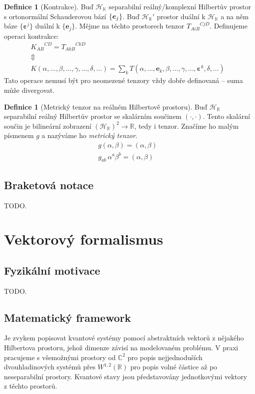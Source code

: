 \documentclass[10pt,a4paper]{report}
\theoremstyle{definition}
\newtheorem{definition}[theorem]{Definice}
\def\R{\mathbb{R}}
\def\C{\mathbb{C}}
\def\K{\mathbb{K}}
\def\H{\mathcal{H}}
\begin{document}
\begin{definition}[Kontrakce]
    Buď $\H_\K$ separabilní reálný/komplexní Hilbertův prostor s ortonormální Schauderovou bází $\vspace{0.3em}\{ \bm{e}_j \}$. Buď ${\H_\K}'$ prostor duální k $\H_\K$ a na něm báze $\{ \bm{\varepsilon}^j \}$ duální k $\{ \bm{e}_j \}$.  Mějme na těchto prostorech tenzor ${T_{AiB}}^{CjD}$. Definujeme operaci kontrakce:
    \begin{gather*}
        {K_{AB}}^{CD} = {T_{AkB}}^{CkD} \\
        \Updownarrow \\
        K(\alpha, ..., \beta, ..., \gamma, ..., \delta, ...)
        = \sum_k T(\alpha, ..., \bm{e}_k, \beta, ..., \gamma, ..., \bm{\varepsilon}^k, \delta, ...)
    \end{gather*}
    Tato operace nemusí být pro neomezené tenzory vždy dobře definovaná – suma může divergovat.
\end{definition}
\begin{definition}[Metrický tenzor na reálném Hilbertově prostoru]
    Buď $\H_\R$ separabilní reálný Hilbertův prostor se skalárním součinem $(\cdot, \cdot)$. Tento skalární součin je bilineární zobrazení $(\H_\R)^2 \to \R$, tedy i tenzor. Značíme ho malým písmenem $g$ a nazýváme ho \textit{metrický tenzor}.
    \begin{gather*}
        g(\alpha, \beta) = (\alpha, \beta) \\[5pt]
        g_{ab} \, \alpha^a \beta^b = (\alpha, \beta)
    \end{gather*}
\end{definition}


\subsection{Braketová notace}
TODO.

\section{Vektorový formalismus}

\subsection{Fyzikální motivace}
TODO.

\subsection{Matematický framework}
Je zvykem popisovat kvantové systémy pomocí abstraktních vektorů z nějakého Hilbertova prostoru, jehož dimenze závisí na modelovaném problému. V praxi pracujeme s všemožnými prostory od $\C^2$ pro popis nejjednoduších dvouhladinových systémů přes $W^{1,2}(\R)$ pro popis volné částice až po neseparabilní prostory. Kvantové stavy jsou představovány jednotkovými vektory z těchto prostorů.
\end{document}
